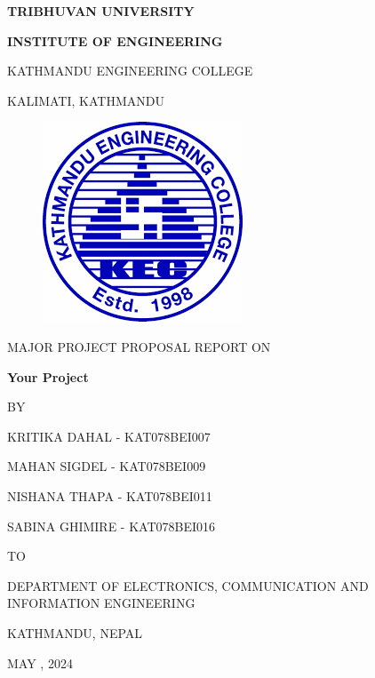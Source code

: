 \begin{titlepage}
    \thispagestyle{empty}
    \begin{center}
    
    \vspace*{\fill} %
    {\large \textbf{TRIBHUVAN UNIVERSITY
}\par}
{\large \textbf{INSTITUTE OF ENGINEERING
}\par}
\vspace{8pt}
KATHMANDU ENGINEERING COLLEGE

KALIMATI, KATHMANDU
\vspace{24pt}

\begin{figure}[ht]
    \centering
    \includegraphics[scale=0.45]{images/kec.png}
\end{figure}
\vspace{24pt}
{MAJOR PROJECT PROPOSAL REPORT ON\par}
\vspace{14pt}
{\textbf{ Your Project}\par}

\vspace{14pt}
{BY\par}
\vspace{14pt}

{KRITIKA DAHAL - KAT078BEI007\par}
{MAHAN SIGDEL - KAT078BEI009\par}
{NISHANA THAPA - KAT078BEI011\par}
{SABINA GHIMIRE - KAT078BEI016\par}

\vspace{24pt}
{TO\par}
\vspace{14pt}
{DEPARTMENT OF ELECTRONICS, COMMUNICATION AND INFORMATION ENGINEERING\par}
{KATHMANDU, NEPAL\par}
{MAY , 2024\par}

    \vspace*{\fill}

    \end{center}
\end{titlepage}